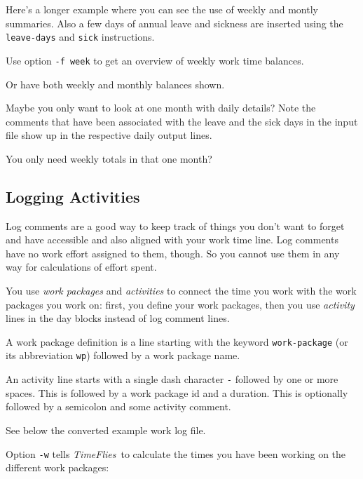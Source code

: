 \documentclass[11pt]{article}
\newcommand{\timeflies}{\emph{TimeFlies}}
\begin{document}
Here's a longer example where you can see the use of weekly and montly summaries. Also a few days of annual leave and sickness are inserted using the \verb:leave-days: and \verb:sick: instructions.



Use option \verb:-f week: to get an overview of weekly work time balances.



Or have both weekly and monthly balances shown.



Maybe you only want to look at one month with daily details? Note the comments that have been associated with the leave and the sick days in the input file show up in the respective daily output lines.



You only need weekly totals in that one month?



\subsection{Logging Activities}

Log comments are a good way to keep track of things you don't want to forget and have accessible and also aligned with your work time line. Log comments have no work effort assigned to them, though. So you cannot use them in any way for calculations of effort spent.

You use \emph{work packages} and \emph{activities} to connect the time you work with the work packages you work on: first, you define your work packages, then you use \emph{activity} lines in the day blocks instead of log comment lines.

A work package definition is a line starting with the keyword \verb:work-package: (or its abbreviation \verb:wp:) followed by a work package name.

An activity line starts with a single dash character \verb:-: followed by one or more spaces. This is followed by a work package id and a duration. This is optionally followed by a semicolon and some activity comment.

See below the converted example work log file.



Option \verb:-w: tells \timeflies\ to calculate the times you have been working on the different work packages:
\end{document}
